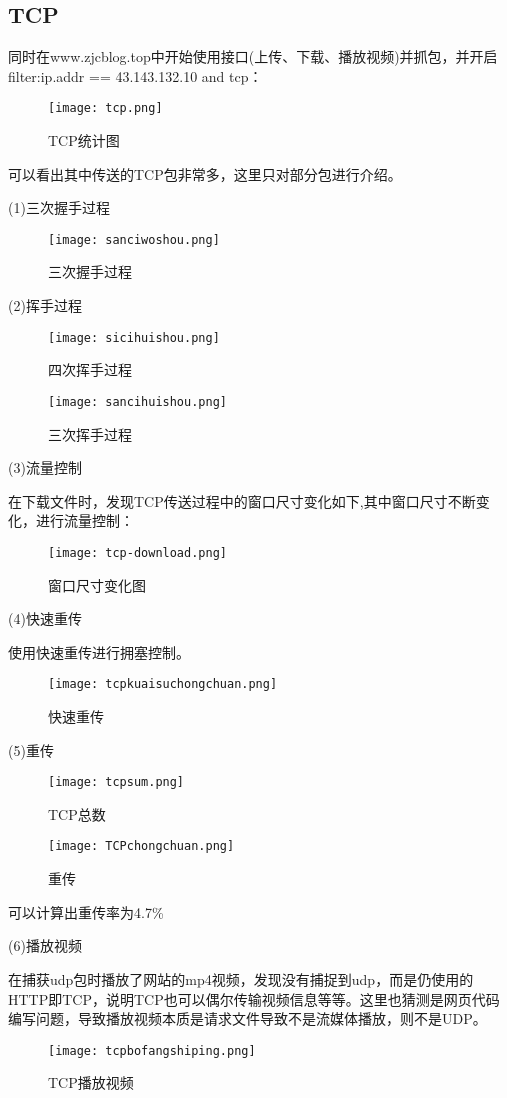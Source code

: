\documentclass{xjtureport}
\begin{document}
\subsection{TCP}
同时在www.zjcblog.top中开始使用接口(上传、下载、播放视频)并抓包，并开启filter:ip.addr == 43.143.132.10 and tcp：
\begin{figure}[H]
	\centering
	\texttt{[image: tcp.png]}
	\caption{TCP统计图}
\end{figure}
可以看出其中传送的TCP包非常多，这里只对部分包进行介绍。\par
(1)三次握手过程
\begin{figure}[H]
	\centering
	\texttt{[image: sanciwoshou.png]}
	\caption{三次握手过程}
\end{figure}
(2)挥手过程
\begin{figure}[H]
	\centering
	\texttt{[image: sicihuishou.png]}
	\caption{四次挥手过程}
\end{figure}
\begin{figure}[H]
	\centering
	\texttt{[image: sancihuishou.png]}
	\caption{三次挥手过程}
\end{figure}
(3)流量控制\par 
在下载文件时，发现TCP传送过程中的窗口尺寸变化如下,其中窗口尺寸不断变化，进行流量控制：
\begin{figure}[H]
	\centering
	\texttt{[image: tcp-download.png]}
	\caption{窗口尺寸变化图}
\end{figure}
(4)快速重传\par
使用快速重传进行拥塞控制。
\begin{figure}[H]
	\centering
	\texttt{[image: tcpkuaisuchongchuan.png]}
	\caption{快速重传}
\end{figure}
(5)重传\par
\begin{figure}[H]
	\centering
	\texttt{[image: tcpsum.png]}
	\caption{TCP总数}
\end{figure}
\begin{figure}[H]
	\centering
	\texttt{[image: TCPchongchuan.png]}
	\caption{重传}
\end{figure}
可以计算出重传率为4.7\% \par
(6)播放视频\par 
在捕获udp包时播放了网站的mp4视频，发现没有捕捉到udp，而是仍使用的HTTP即TCP，说明TCP也可以偶尔传输视频信息等等。这里也猜测是网页代码编写问题，导致播放视频本质是请求文件导致不是流媒体播放，则不是UDP。
\begin{figure}[H]
	\centering
	\texttt{[image: tcpbofangshiping.png]}
	\caption{TCP播放视频}
\end{figure}
\end{document}
